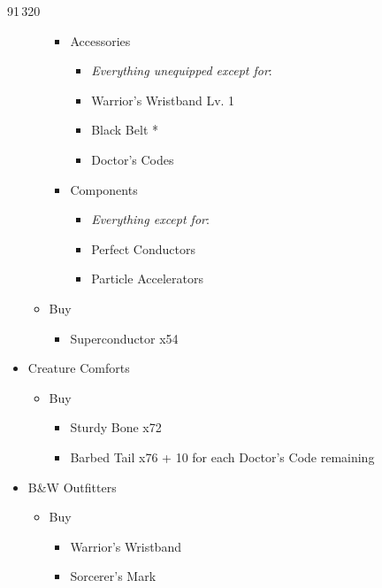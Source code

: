 \begin{paracol}{2}
\begin{shop}{91\,320}
\begin{itemize}
\begin{itemize}
\begin{itemize}
\begin{itemize}
					                  \end{itemize}
					            \item Accessories
					                  \begin{itemize}
						                  \item \textit{Everything unequipped except for}:
						                  \item Warrior's Wristband Lv. 1
						                  \item Black Belt *
						                  \item Doctor's Codes
					                  \end{itemize}
					            \item Components
					                  \begin{itemize}
						                  \item \textit{Everything except for}:
						                  \item Perfect Conductors
						                  \item Particle Accelerators
					                  \end{itemize}
				            \end{itemize}
				      \item Buy
				            \begin{itemize}
					            \item Superconductor x54
				            \end{itemize}
			      \end{itemize}
			\item Creature Comforts
			      \begin{itemize}
				      \item Buy
				            \begin{itemize}
					            \item Sturdy Bone x72
					            \item Barbed Tail x76 + 10 for each Doctor's Code remaining
				            \end{itemize}
			      \end{itemize}
			\item B\&W Outfitters
			      \begin{itemize}
				      \item Buy
				            \begin{itemize}
					            \item Warrior's Wristband
					            \item Sorcerer's Mark

\end{itemize}
\end{itemize}
\end{itemize}
\end{shop}
\end{paracol}
